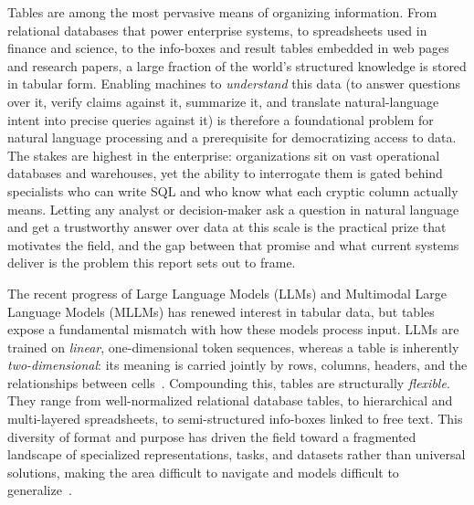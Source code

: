 Tables are among the most pervasive means of organizing information. From relational databases that power enterprise systems, to spreadsheets used in finance and science, to the info-boxes and result tables embedded in web pages and research papers, a large fraction of the world's structured knowledge is stored in tabular form. Enabling machines to \emph{understand} this data (to answer questions over it, verify claims against it, summarize it, and translate natural-language intent into precise queries against it) is therefore a foundational problem for natural language processing and a prerequisite for democratizing access to data. The stakes are highest in the enterprise: organizations sit on vast operational databases and warehouses, yet the ability to interrogate them is gated behind specialists who can write SQL and who know what each cryptic column actually means. Letting any analyst or decision-maker ask a question in natural language and get a trustworthy answer over data at this scale is the practical prize that motivates the field, and the gap between that promise and what current systems deliver is the problem this report sets out to frame.

The recent progress of Large Language Models (LLMs) and Multimodal Large Language Models (MLLMs) has renewed interest in tabular data, but tables expose a fundamental mismatch with how these models process input. LLMs are trained on \emph{linear}, one-dimensional token sequences, whereas a table is inherently \emph{two-dimensional}: its meaning is carried jointly by rows, columns, headers, and the relationships between cells~\cite{wu2025tabular}. Compounding this, tables are structurally \emph{flexible}. They range from well-normalized relational database tables, to hierarchical and multi-layered spreadsheets, to semi-structured info-boxes linked to free text. This diversity of format and purpose has driven the field toward a fragmented landscape of specialized representations, tasks, and datasets rather than universal solutions, making the area difficult to navigate and models difficult to generalize~\cite{wu2025tabular}.

